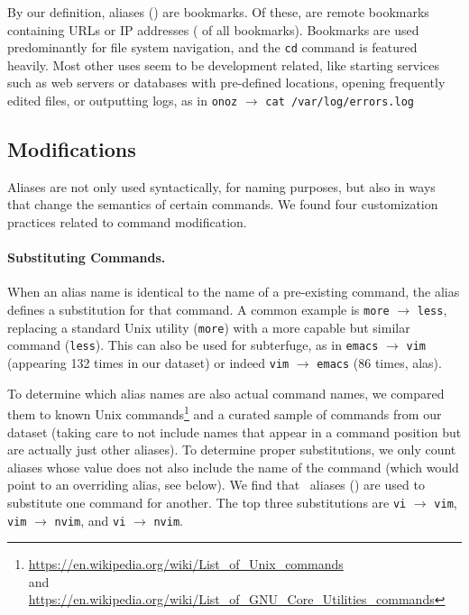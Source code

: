 \documentclass[sigconf,nonacm,screen]{acmart}
\newcommand{\num}[1]{\numprint{#1}}
\newcommand{\per}[1]{\numprint[\%]{#1}}
\newcommand{\alias}[2]{{\texttt{#1} $\rightarrow$ \texttt{#2}}}
\newcommand{\cmd}[1]{{\texttt{#1}}}
\begin{document}
By our definition, \num{321546} aliases (\per{14.59}) are bookmarks.
Of these, \num{59931} are remote bookmarks containing URLs or IP addresses (\per{15.92} of all bookmarks).
Bookmarks are used predominantly for file system navigation, and the \verb|cd| command is featured heavily.
Most other uses seem to be development related, like starting services such as web servers or databases with pre-defined locations, opening frequently edited files, or outputting logs, as in \alias{onoz}{cat /var/log/errors.log}

%     

\subsection{Modifications}

Aliases are not only used syntactically, for naming purposes, but also in ways that change the semantics of certain commands.
We found four customization practices related to command modification.

\paragraph{\bf Substituting Commands.}

When an alias name is identical to the name of a pre-existing command, the alias defines a substitution for that command.
A common example is \alias{more}{less}, replacing a standard Unix utility (\cmd{more}) with a more capable but similar command (\cmd{less}).
This can also be used for subterfuge, as in \alias{emacs}{vim} (appearing 132 times in our dataset) or indeed \alias{vim}{emacs} (86 times, alas).

To determine which alias names are also actual command names, we compared them to known Unix commands\footnote{\url{https://en.wikipedia.org/wiki/List_of_Unix_commands}\\ and \url{https://en.wikipedia.org/wiki/List_of_GNU_Core_Utilities_commands}} and a curated sample of commands from our dataset (taking care to not include names that appear in a command position but are actually just other aliases).
To determine proper substitutions, we only count aliases whose value does not also include the name of the command (which would point to an overriding alias, see below).
We find that \num{100564}~aliases (\per{4.56}) are used to substitute one command for another.
The top three substitutions are \verb|vi| $\rightarrow$ \verb|vim|, \verb|vim| $\rightarrow$ \verb|nvim|, and \verb|vi| $\rightarrow$ \verb|nvim|.
\end{document}
